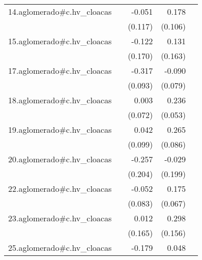 {\begin{longtable}{l*{4}{D{.}{.}{-1}}}
\addlinespace
14.aglomerado#c.hv\_cloacas&                     &      -0.051         &       0.178         &                     \\
            &                     &     (0.117)         &     (0.106)         &                     \\
\addlinespace
15.aglomerado#c.hv\_cloacas&                     &      -0.122         &       0.131         &                     \\
            &                     &     (0.170)         &     (0.163)         &                     \\
\addlinespace
17.aglomerado#c.hv\_cloacas&                     &      -0.317\sym{***}&      -0.090         &                     \\
            &                     &     (0.093)         &     (0.079)         &                     \\
\addlinespace
18.aglomerado#c.hv\_cloacas&                     &       0.003         &       0.236\sym{***}&                     \\
            &                     &     (0.072)         &     (0.053)         &                     \\
\addlinespace
19.aglomerado#c.hv\_cloacas&                     &       0.042         &       0.265\sym{**} &                     \\
            &                     &     (0.099)         &     (0.086)         &                     \\
\addlinespace
20.aglomerado#c.hv\_cloacas&                     &      -0.257         &      -0.029         &                     \\
            &                     &     (0.204)         &     (0.199)         &                     \\
\addlinespace
22.aglomerado#c.hv\_cloacas&                     &      -0.052         &       0.175\sym{**} &                     \\
            &                     &     (0.083)         &     (0.067)         &                     \\
\addlinespace
23.aglomerado#c.hv\_cloacas&                     &       0.012         &       0.298         &                     \\
            &                     &     (0.165)         &     (0.156)         &                     \\
\addlinespace
25.aglomerado#c.hv\_cloacas&                     &      -0.179\sym{*}  &       0.048         &                     \\

\end{longtable}}
